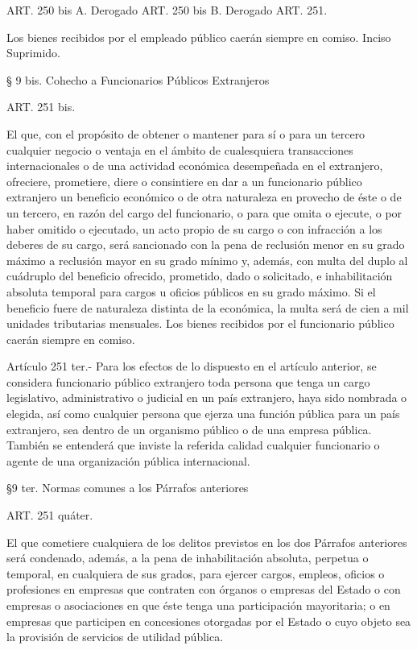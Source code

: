     ART. 250 bis A. Derogado
    ART. 250 bis B. Derogado
    ART. 251.

    Los bienes recibidos por el empleado público caerán siempre en comiso.
    Inciso Suprimido.





    § 9 bis. Cohecho a Funcionarios Públicos Extranjeros


    ART. 251 bis.

    El que, con el propósito de obtener o mantener para sí o para un tercero cualquier negocio o ventaja en el ámbito de cualesquiera transacciones internacionales o de una actividad económica desempeñada en el extranjero, ofreciere, prometiere, diere o consintiere en dar a un funcionario público extranjero un beneficio económico o de otra naturaleza en provecho de éste o de un tercero, en razón del cargo del funcionario, o para que omita o ejecute, o por haber omitido o ejecutado, un acto propio de su cargo o con infracción a los deberes de su cargo, será sancionado con la pena de reclusión menor en su grado máximo a reclusión mayor en su grado mínimo y, además, con multa del duplo al cuádruplo del beneficio ofrecido, prometido, dado o solicitado, e inhabilitación absoluta temporal para cargos u oficios públicos en su grado máximo. Si el beneficio fuere de naturaleza distinta de la económica, la multa será de cien a mil unidades tributarias mensuales.
    Los bienes recibidos por el funcionario público caerán siempre en comiso.


    Artículo 251 ter.- Para los efectos de lo dispuesto en el artículo anterior, se considera funcionario público extranjero toda persona que tenga un cargo legislativo, administrativo o judicial en un país extranjero, haya sido nombrada o elegida, así como cualquier persona que ejerza una función pública para un país extranjero, sea dentro de un organismo público o de una empresa pública. También se entenderá que inviste la referida calidad cualquier funcionario o agente de una organización pública internacional.


    §9 ter. Normas comunes a los Párrafos anteriores






   
    ART. 251 quáter.

    El que cometiere cualquiera de los delitos previstos en los dos Párrafos anteriores será condenado, además, a la pena de inhabilitación absoluta, perpetua o temporal, en cualquiera de sus grados, para ejercer cargos, empleos, oficios o profesiones en empresas que contraten con órganos o empresas del Estado o con empresas o asociaciones en que éste tenga una participación mayoritaria; o en empresas que participen en concesiones otorgadas por el Estado o cuyo objeto sea la provisión de servicios de utilidad pública.

